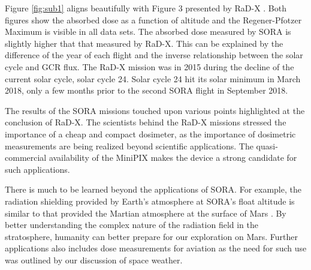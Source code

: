 Figure \ref{fig:sub1} aligns beautifully with Figure 3 presented by RaD-X \cite{rad-x}. Both figures show the absorbed dose as a function of altitude and the Regener-Pfotzer Maximum is visible in all data sets. The absorbed dose measured by SORA is slightly higher that that measured by RaD-X. This can be explained by the difference of the year of each flight and the inverse relationship between the solar cycle and GCR flux. The RaD-X mission was in 2015 during the decline of the current solar cycle, solar cycle \num{24}. Solar cycle \num{24} hit its solar minimum in March 2018, only a few months prior to the second SORA flight in September 2018. 

The results of the SORA missions touched upon various points highlighted at the conclusion of RaD-X. The scientists behind the RaD-X missions stressed the importance of a cheap and compact dosimeter, as the importance of dosimetric measurements are being realized beyond scientific applications. The quasi-commercial availability of the MiniPIX makes the device a strong candidate for such applications.

There is much to be learned beyond the applications of SORA. For example, the radiation shielding provided by Earth's atmosphere at SORA's float altitude is similar to that provided the Martian atmosphere at the surface of Mars \cite{rad-x}. By better understanding the complex nature of the radiation field in the stratosphere, humanity can better prepare for our exploration on Mars. Further applications also includes dose measurements for aviation as the need for such use was outlined by our discussion of space weather.



